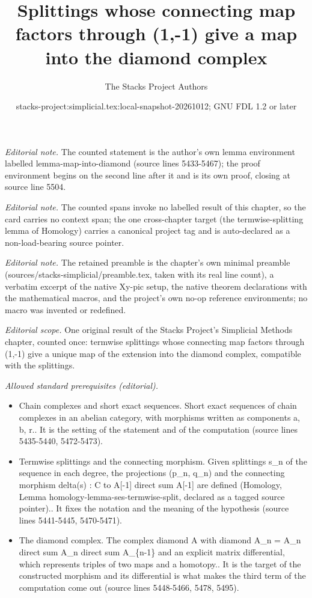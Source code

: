 \documentclass{stacks-project}
\title{Splittings whose connecting map factors through (1,-1) give a map into the diamond complex}
\author{The Stacks Project Authors}
\date{stacks-project:simplicial.tex:local-snapshot-20261012; GNU FDL 1.2 or later}
\theoremstyle{plain}
\theoremstyle{definition}
\theoremstyle{remark}
\numberwithin{equation}{subsection}
\begin{document}
\maketitle
\noindent\textit{Editorial note.} The counted statement is the author's own lemma environment labelled lemma-map-into-diamond (source lines 5433-5467); the proof environment begins on the second line after it and is its own proof, closing at source line 5504.\par\medskip
\noindent\textit{Editorial note.} The counted spans invoke no labelled result of this chapter, so the card carries no context span; the one cross-chapter target (the termwise-splitting lemma of Homology) carries a canonical project tag and is auto-declared as a non-load-bearing source pointer.\par\medskip
\noindent\textit{Editorial note.} The retained preamble is the chapter's own minimal preamble (sources/stacks-simplicial/preamble.tex, taken with its real line count), a verbatim excerpt of the native Xy-pic setup, the native theorem declarations with the mathematical macros, and the project's own no-op reference environments; no macro was invented or redefined.\par\medskip
\noindent\textit{Editorial scope.} One original result of the Stacks Project's Simplicial Methods chapter, counted once: termwise splittings whose connecting map factors through (1,-1) give a unique map of the extension into the diamond complex, compatible with the splittings.\par\medskip
\noindent\textit{Allowed standard prerequisites (editorial).}\begin{itemize}
\item Chain complexes and short exact sequences. Short exact sequences of chain complexes in an abelian category, with morphisms written as components a, b, r.. It is the setting of the statement and of the computation (source lines 5435-5440, 5472-5473).
\item Termwise splittings and the connecting morphism. Given splittings s\_n of the sequence in each degree, the projections (p\_n, q\_n) and the connecting morphism delta(s) : C to A[-1] direct sum A[-1] are defined (Homology, Lemma homology-lemma-ses-termwise-split, declared as a tagged source pointer).. It fixes the notation and the meaning of the hypothesis (source lines 5441-5445, 5470-5471).
\item The diamond complex. The complex diamond A with diamond A\_n = A\_n direct sum A\_n direct sum A\_\{n-1\} and an explicit matrix differential, which represents triples of two maps and a homotopy.. It is the target of the constructed morphism and its differential is what makes the third term of the computation come out (source lines 5448-5466, 5478, 5495).
\end{itemize}\medskip
\end{document}
